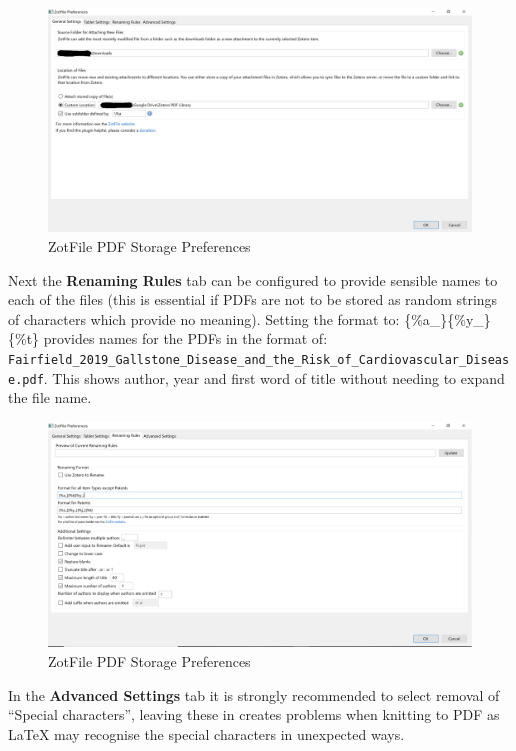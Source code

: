 \documentclass[
]{book}
\begin{document}
\begin{figure}
\includegraphics[width=44.44in]{img/zotfile_preferences} \caption{ZotFile PDF Storage Preferences}\label{fig:zotfile-preferences}
\end{figure}

Next the \textbf{Renaming Rules} tab can be configured to provide sensible names to each of the files (this is essential if PDFs are not to be stored as random strings of characters which provide no meaning). Setting the format to: \{\%a\_\}\{\%y\_\}\{\%t\} provides names for the PDFs in the format of: \texttt{Fairfield\_2019\_Gallstone\_Disease\_and\_the\_Risk\_of\_Cardiovascular\_Disease.pdf}. This shows author, year and first word of title without needing to expand the file name.

\begin{figure}
\includegraphics[width=44.47in]{img/zotfile_renaming} \caption{ZotFile PDF Storage Preferences}\label{fig:zotfile-renaming}
\end{figure}

In the \textbf{Advanced Settings} tab it is strongly recommended to select removal of ``Special characters'', leaving these in creates problems when knitting to PDF as LaTeX may recognise the special characters in unexpected ways.
\end{document}
